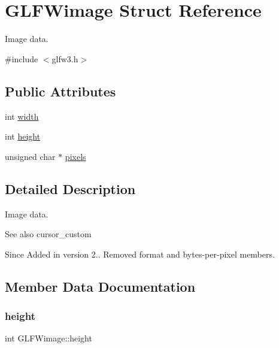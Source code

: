\hypertarget{struct_g_l_f_wimage}{}\section{G\+L\+F\+Wimage Struct Reference}
\label{struct_g_l_f_wimage}


Image data.  




{\ttfamily \#include $<$glfw3.\+h$>$}

\subsection*{Public Attributes}
\begin{DoxyCompactItemize}
\item 
int \hyperlink{struct_g_l_f_wimage_af6a71cc999fe6d3aea31dd7e9687d835}{width}
\item 
int \hyperlink{struct_g_l_f_wimage_a0b7d95368f0c80d5e5c9875057c7dbec}{height}
\item 
unsigned char $\ast$ \hyperlink{struct_g_l_f_wimage_a0c532a5c2bb715555279b7817daba0fb}{pixels}
\end{DoxyCompactItemize}


\subsection{Detailed Description}
Image data. 

\begin{DoxySeeAlso}{See also}
cursor\+\_\+custom
\end{DoxySeeAlso}
\begin{DoxySince}{Since}
Added in version 2..  Removed format and bytes-\/per-\/pixel members. 
\end{DoxySince}


\subsection{Member Data Documentation}
\mbox{\label{struct_g_l_f_wimage_a0b7d95368f0c80d5e5c9875057c7dbec}} 
\subsubsection{\texorpdfstring{height}{height}}
{\footnotesize\ttfamily int G\+L\+F\+Wimage\+::height}

